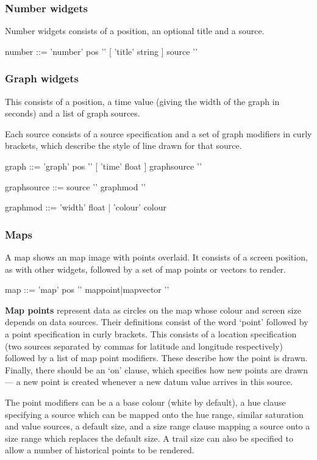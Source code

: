 \subsubsection{Number widgets}
Number widgets consists of a position, an optional title and
a source.
\begin{v}
number      ::= 'number' pos '{' [ 'title' string ] source '}'
\end{v}

\subsubsection{Graph widgets}
This consists of a position, a time value (giving
the width of the graph in seconds) and a list of graph
sources.

Each source consists of a source specification and a set
of graph modifiers in curly brackets, which describe the
style of line drawn for that source.

\begin{v}
graph       ::= 'graph' pos '{' [ 'time' float ] { graphsource } '}'

graphsource ::= source '{' { graphmod } '}'

graphmod    ::= 'width' float 
            |   'colour' colour
\end{v}

\subsubsection{Maps}
A map shows an map image with points overlaid. It consists
of a screen position, as with other widgets,
followed by a set of map points or vectors to render.

\begin{v}
map         ::= 'map' pos '{' { mappoint|mapvector } '}'
\end{v}

\textbf{Map points} represent data as circles on the map
whose colour and screen size depends on data sources.
Their definitions consist of the word `point' followed
by a point specification in curly brackets.
This consists of a location specification
(two sources separated by commas for latitude and longitude
respectively) followed by a list of map point modifiers.
These describe how the point is drawn. Finally, there should
be an `on' clause, which specifies how new points are drawn ---
a new point is created whenever a new datum value
arrives in this source.

The point modifiers can be a a base colour (white by default),
a hue clause specifying a source which can be mapped onto the 
hue range, similar saturation and value sources, a default
size, and a size range clause mapping a source onto a size range
which replaces the default size. A trail size can also be specified
to allow a number of historical points to be rendered.

